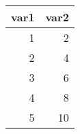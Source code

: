 \begin{tabular}{rr}
\toprule
var1 & var2 \\
\midrule
1 & 2 \\
2 & 4 \\
3 & 6 \\
4 & 8 \\
5 & 10 \\
\bottomrule
\end{tabular}
